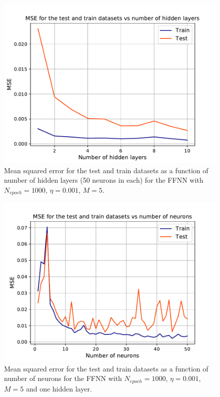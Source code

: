 \documentclass{emulateapj}
\begin{document}
\begin{figure}[t!]
    \centering
    \includegraphics[width=.49\textwidth]{Figures/NN_MSE_layers.pdf}
    \caption{Mean squared error for the test and train datasets as a function of number of hidden layers (50 neurons in each) for the FFNN with $N_{epoch}=1000$, $\eta=0.001$, $M=5$.}
    \label{fig: NN_MSE_layers}
\end{figure}

\begin{figure}[t!]
    \centering
    \includegraphics[width=.49\textwidth]{Figures/NN_MSE_neurons.pdf}
    \caption{Mean squared error for the test and train datasets as a function of number of neurons for the FFNN with $N_{epoch}=1000$, $\eta=0.001$, $M=5$ and one hidden layer.}
    \label{fig: NN_MSE_neurons}
\end{figure}
\end{document}
